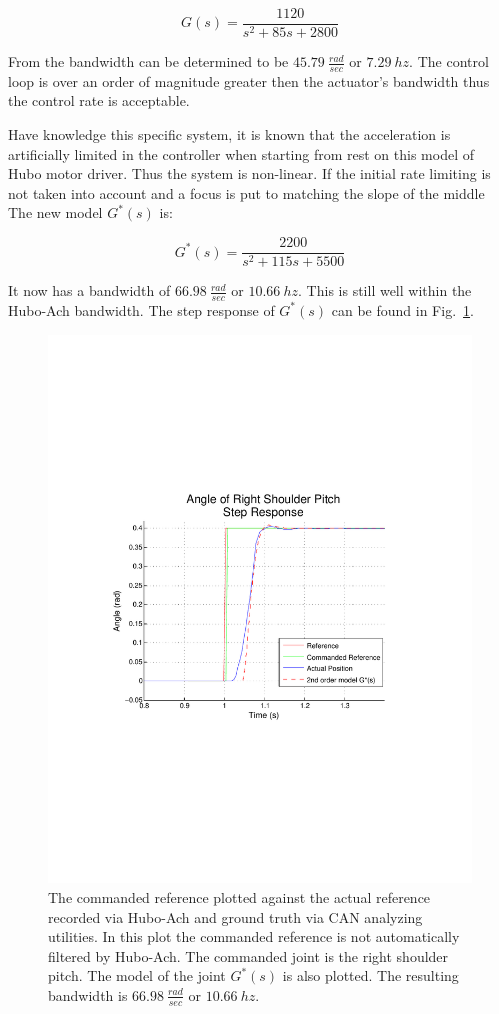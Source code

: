 \begin{equation}
G(s) = \frac{1120}{s^2 + 85 s + 2800}
\end{equation}

From the bandwidth can be determined to be $45.79~\frac{rad}{sec}$ or $7.29~hz$.
The control loop is over an order of magnitude greater then the actuator's bandwidth thus the control rate is acceptable.

Have knowledge this specific system, it is known that the acceleration is artificially limited in the controller when starting from rest on this model of Hubo motor driver.
Thus the system is non-linear.
If the initial rate limiting is not taken into account and a focus is put to matching the slope of the middle 
The new model $G^*(s)$ is:


\begin{equation}
G^*(s) = \frac{2200}{s^2 + 115 s + 5500}
\end{equation}

It now has a bandwidth of $66.98~\frac{rad}{sec}$ or $10.66~hz$.
This is still well within the Hubo-Ach bandwidth.
The step response of $G^*(s)$ can be found in Fig.~\ref{fig:singleJointStep2}.


\begin{figure}[thpb]
  \centering
\includegraphics[width=0.8\columnwidth]{./throwGraph/RSP-Zp4-step-step-real2Fast.pdf}
  \caption{The commanded reference plotted against the actual reference recorded via Hubo-Ach and ground truth via CAN analyzing utilities.  In this plot the commanded reference is not automatically filtered by Hubo-Ach.  The commanded joint is the right shoulder pitch.  The model of the joint $G^*(s)$ is also plotted.  The resulting bandwidth is $66.98~\frac{rad}{sec}$ or $10.66~hz$.}
  \label{fig:singleJointStep2}
\end{figure}




